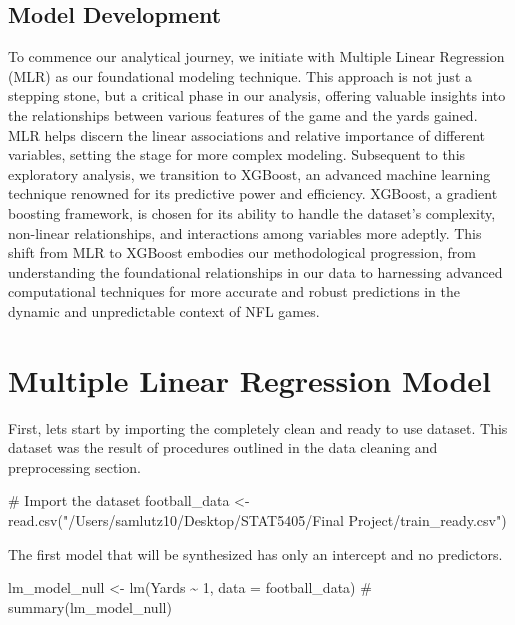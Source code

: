 \documentclass[
  super,
  preprint,
  3p]{elsarticle}
\newenvironment{Shaded}{\begin{snugshade}}{\end{snugshade}}
\newcommand{\AttributeTok}[1]{\textcolor[rgb]{0.40,0.45,0.13}{#1}}
\newcommand{\CommentTok}[1]{\textcolor[rgb]{0.37,0.37,0.37}{#1}}
\newcommand{\DecValTok}[1]{\textcolor[rgb]{0.68,0.00,0.00}{#1}}
\newcommand{\FunctionTok}[1]{\textcolor[rgb]{0.28,0.35,0.67}{#1}}
\newcommand{\NormalTok}[1]{\textcolor[rgb]{0.00,0.23,0.31}{#1}}
\newcommand{\OtherTok}[1]{\textcolor[rgb]{0.00,0.23,0.31}{#1}}
\newcommand{\SpecialCharTok}[1]{\textcolor[rgb]{0.37,0.37,0.37}{#1}}
\newcommand{\StringTok}[1]{\textcolor[rgb]{0.13,0.47,0.30}{#1}}
\begin{document}
\hypertarget{model-development}{%
\subsection{Model Development}\label{model-development}}

To commence our analytical journey, we initiate with Multiple Linear
Regression (MLR) as our foundational modeling technique. This approach
is not just a stepping stone, but a critical phase in our analysis,
offering valuable insights into the relationships between various
features of the game and the yards gained. MLR helps discern the linear
associations and relative importance of different variables, setting the
stage for more complex modeling. Subsequent to this exploratory
analysis, we transition to XGBoost, an advanced machine learning
technique renowned for its predictive power and efficiency. XGBoost, a
gradient boosting framework, is chosen for its ability to handle the
dataset's complexity, non-linear relationships, and interactions among
variables more adeptly. This shift from MLR to XGBoost embodies our
methodological progression, from understanding the foundational
relationships in our data to harnessing advanced computational
techniques for more accurate and robust predictions in the dynamic and
unpredictable context of NFL games.

\hypertarget{multiple-linear-regression-model}{%
\section{Multiple Linear Regression
Model}\label{multiple-linear-regression-model}}

First, lets start by importing the completely clean and ready to use
dataset. This dataset was the result of procedures outlined in the data
cleaning and preprocessing section.

\begin{Shaded}
\begin{Highlighting}[]
\CommentTok{\# Import the dataset}
\NormalTok{football\_data }\OtherTok{\textless{}{-}} \FunctionTok{read.csv}\NormalTok{(}\StringTok{"/Users/samlutz10/Desktop/STAT5405/Final Project/train\_ready.csv"}\NormalTok{)}
\end{Highlighting}
\end{Shaded}

The first model that will be synthesized has only an intercept and no
predictors.

\begin{Shaded}
\begin{Highlighting}[]
\NormalTok{lm\_model\_null }\OtherTok{\textless{}{-}} \FunctionTok{lm}\NormalTok{(Yards }\SpecialCharTok{\textasciitilde{}} \DecValTok{1}\NormalTok{, }\AttributeTok{data =}\NormalTok{ football\_data)}
\CommentTok{\# summary(lm\_model\_null)}
\end{Highlighting}
\end{Shaded}
\end{document}
